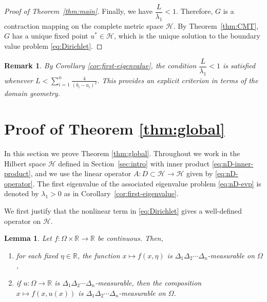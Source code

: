 \documentclass{article}
\newtheorem{lemma}[theorem]{Lemma}
\newtheorem{remark}[theorem]{Remark}
\numberwithin{equation}{section}
\numberwithin{theorem}{section}
\begin{document}
\begin{proof}[Proof of Theorem~\ref{thm:main}]
Finally, we have $\dfrac{L}{\lambda_1} < 1$. Therefore, $G$ is a contraction mapping on the complete metric space $\mathscr{H}$. By Theorem~\ref{thm:CMT}, $G$ has a unique fixed point $u^* \in \mathscr{H}$, which is the unique solution to the boundary value problem \eqref{eq:Dirichlet}.
\end{proof}

\begin{remark}\label{rem:explicit-bound}
By Corollary \ref{cor:first-eigenvalue}, the condition $\dfrac{L}{\lambda_1} < 1$ is satisfied whenever
$L < \displaystyle\sum_{i=1}^{n} \frac{4}{(b_i - a_i)^2}.$
This provides an explicit criterion in terms of the domain geometry.
\end{remark}

\section{Proof of Theorem \ref{thm:global}}\label{sec:proof-global}

In this section we prove Theorem \ref{thm:global}. Throughout we work in the Hilbert space $\mathscr{H}$ defined in Section~\ref{sec:intro} with inner product \eqref{eq:nD-inner-product}, and we use the linear operator $A\colon D\subset \mathscr{H}\to \mathscr{H}$ given by \eqref{eq:nD-operator}. The first eigenvalue of the associated eigenvalue problem \eqref{eq:nD-evp} is denoted by $\lambda_1>0$ as in Corollary~\ref{cor:first-eigenvalue}.

We first justify that the nonlinear term in \eqref{eq:Dirichlet} gives a well-defined operator on $\mathscr{H}$.
\begin{lemma}\label{lem:measurable-global}
Let $f\colon\Omega\times\mathbb{R}\to\mathbb{R}$ be continuous. Then,
\begin{enumerate}
\item[(i)] for each fixed $\eta\in\mathbb{R}$, the function
$x \mapsto f(x,\eta)$
is $\Delta_1\Delta_2\cdots\Delta_n$-measurable on $\Omega$,
\item[(ii)] if $u\colon\Omega\to\mathbb{R}$ is $\Delta_1\Delta_2\cdots\Delta_n$-measurable, then the composition
$x \mapsto f(x,u(x))$
is $\Delta_1\Delta_2\cdots\Delta_n$-measurable on $\Omega$.
\end{enumerate}
\end{lemma}
\end{document}
